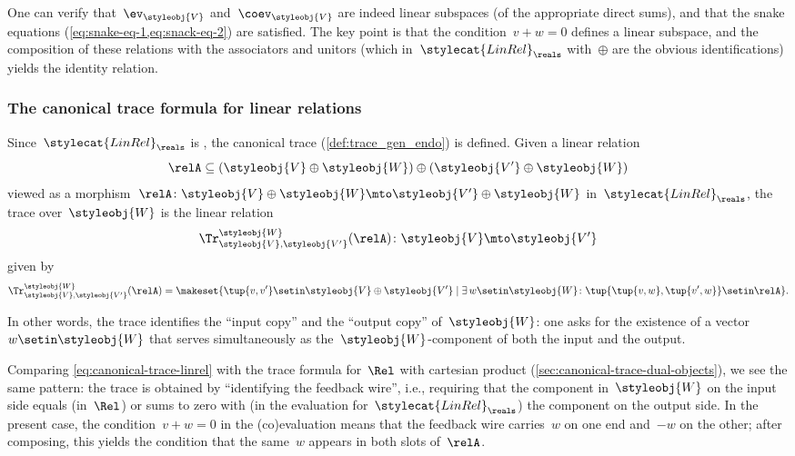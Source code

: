 \begin{remark}
    One can verify that~$\ev_\styleobj{V}$ and~$\coev_\styleobj{V}$ are indeed linear subspaces (of the appropriate direct sums), and that the snake equations (\cref{eq:snake-eq-1,eq:snack-eq-2}) are satisfied.
    The key point is that the condition~$v + w = 0$ defines a linear subspace, and the composition of these relations with the associators and unitors (which in~$\stylecat{LinRel}_\reals$ with~$\oplus$ are the obvious identifications) yields the identity relation.
\end{remark}

\subsubsection{The canonical trace formula for linear relations}

Since~$\stylecat{LinRel}_\reals$ is , the canonical trace (\cref{def:trace_gen_endo}) is defined.
Given a linear relation
\begin{equation}
    \relA \subseteq (\styleobj{V} \oplus \styleobj{W}) \oplus (\styleobj{V'} \oplus \styleobj{W})
\end{equation}
viewed as a morphism~$\relA \colon \styleobj{V} \oplus \styleobj{W} \mto \styleobj{V'} \oplus \styleobj{W}$ in~$\stylecat{LinRel}_\reals$, the trace over~$\styleobj{W}$ is the linear relation
\begin{equation}
    \Tr_{\styleobj{V}, \styleobj{V'}}^{\styleobj{W}}(\relA) \colon \styleobj{V} \mto \styleobj{V'}
\end{equation}
given by
\begin{equation}
    \label{eq:canonical-trace-linrel}
    \Tr_{\styleobj{V}, \styleobj{V'}}^{\styleobj{W}}(\relA) = \makeset{ \tup{v, v'} \setin \styleobj{V} \oplus \styleobj{V'} \mid \exists\, w \setin \styleobj{W} \colon \tup{\tup{v, w}, \tup{v', w}} \setin \relA }.
\end{equation}

In other words, the trace identifies the ``input copy'' and the ``output copy'' of~$\styleobj{W}$: one asks for the existence of a vector~$w \setin \styleobj{W}$ that serves simultaneously as the~$\styleobj{W}$-component of both the input and the output.

\begin{remark}
    Comparing \cref{eq:canonical-trace-linrel} with the trace formula for~$\Rel$ with cartesian product (\cref{sec:canonical-trace-dual-objects}), we see the same pattern: the trace is obtained by ``identifying the feedback wire'', i.e., requiring that the component in~$\styleobj{W}$ on the input side equals (in~$\Rel$) or sums to zero with (in the evaluation for~$\stylecat{LinRel}_\reals$) the component on the output side.
    In the present case, the condition~$v + w = 0$ in the (co)evaluation means that the feedback wire carries~$w$ on one end and~$-w$ on the other; after composing, this yields the condition that the same~$w$ appears in both slots of~$\relA$.
\end{remark}

